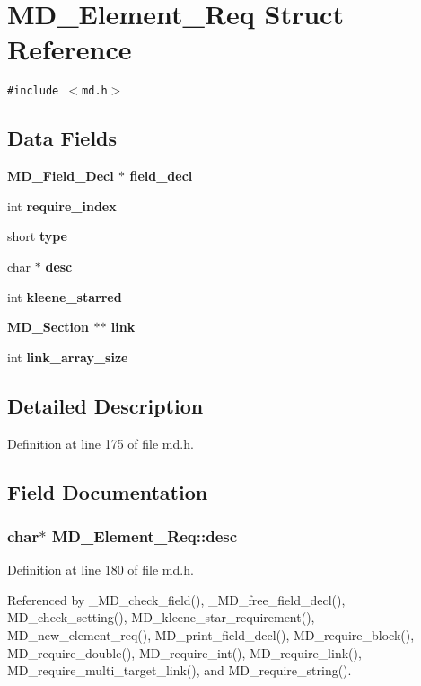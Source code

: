 \section{MD\_\-Element\_\-Req Struct Reference}
\label{structMD__Element__Req}
{\tt \#include $<$md.h$>$}

\subsection*{Data Fields}
\begin{CompactItemize}
\item 
\bf{MD\_\-Field\_\-Decl} $\ast$ \bf{field\_\-decl}
\item 
int \bf{require\_\-index}
\item 
short \bf{type}
\item 
char $\ast$ \bf{desc}
\item 
int \bf{kleene\_\-starred}
\item 
\bf{MD\_\-Section} $\ast$$\ast$ \bf{link}
\item 
int \bf{link\_\-array\_\-size}
\end{CompactItemize}


\subsection{Detailed Description}




Definition at line 175 of file md.h.

\subsection{Field Documentation}
\subsubsection{\setlength{\rightskip}{0pt plus 5cm}char$\ast$ \bf{MD\_\-Element\_\-Req::desc}}\label{structMD__Element__Req_4a1421eee658ca20b378a5276ea4f90e}




Definition at line 180 of file md.h.

Referenced by \_\-MD\_\-check\_\-field(), \_\-MD\_\-free\_\-field\_\-decl(), MD\_\-check\_\-setting(), MD\_\-kleene\_\-star\_\-requirement(), MD\_\-new\_\-element\_\-req(), MD\_\-print\_\-field\_\-decl(), MD\_\-require\_\-block(), MD\_\-require\_\-double(), MD\_\-require\_\-int(), MD\_\-require\_\-link(), MD\_\-require\_\-multi\_\-target\_\-link(), and MD\_\-require\_\-string().
